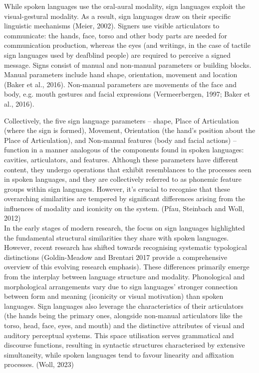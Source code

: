 While spoken languages use the oral-aural modality, sign languages exploit the visual-gestural modality. As a result, sign languages draw on their specific linguistic mechanisms (Meier, 2002). Signers use visible articulators to communicate: the hands, face, torso and other body parts are needed for communication production, whereas the eyes (and writings, in the case of tactile sign languages used by deafblind people) are required to perceive a signed message. Signs consist of manual and non-manual parameters or building blocks. Manual parameters include hand shape, orientation, movement and location (Baker et al., 2016). Non-manual parameters are movements of the face and body, e.g. mouth gestures and facial expressions (Vermeerbergen, 1997; Baker et al., 2016).

Collectively, the five sign language parameters – shape, Place of Articulation (where the sign is formed), Movement, Orientation (the hand's position about the Place of Articulation), and Non-manual features (body and facial actions) – function in a manner analogous of the components found in spoken languages: cavities, articulators, and features. Although these parameters have different content, they undergo operations that exhibit resemblances to the processes seen in spoken languages, and they are collectively referred to as phonemic feature groups within sign languages. However, it's crucial to recognise that these overarching similarities are tempered by significant differences arising from the influences of modality and iconicity on the system. (Pfau, Steinbach and Woll, 2012) \\
 In the early stages of modern research, the focus on sign languages highlighted the fundamental structural similarities they share with spoken languages. However, recent research has shifted towards recognising systematic typological distinctions (Goldin-Meadow and Brentari 2017 provide a comprehensive overview of this evolving research emphasis). These differences primarily emerge from the interplay between language structure and modality. Phonological and morphological arrangements vary due to sign languages' stronger connection between form and meaning (iconicity or visual motivation) than spoken languages. Sign languages also leverage the characteristics of their articulators (the hands being the primary ones, alongside non-manual articulators like the torso, head, face, eyes, and mouth) and the distinctive attributes of visual and auditory perceptual systems. This space utilisation serves grammatical and discourse functions, resulting in syntactic structures characterised by extensive simultaneity, while spoken languages tend to favour linearity and affixation processes. (Woll, 2023)\\


